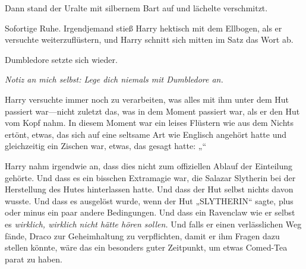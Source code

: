 Dann stand der Uralte mit silbernem Bart auf und lächelte verschmitzt.

Sofortige Ruhe. Irgendjemand stieß Harry hektisch mit dem Ellbogen, als er versuchte weiterzuflüstern, und Harry schnitt sich mitten im Satz das Wort ab.

Dumbledore setzte sich wieder.

\emph{Notiz an mich selbst: Lege dich niemals mit Dumbledore an.}

Harry versuchte immer noch zu verarbeiten, was alles mit ihm unter dem Hut passiert war—nicht zuletzt das, was in dem Moment passiert war, als er den Hut vom Kopf nahm. In diesem Moment war ein leises Flüstern wie aus dem Nichts ertönt, etwas, das sich auf eine seltsame Art wie Englisch angehört hatte und gleichzeitig ein Zischen war, etwas, das gesagt hatte: „“

Harry nahm irgendwie an, dass dies nicht zum offiziellen Ablauf der Einteilung gehörte. Und dass es ein bisschen Extramagie war, die Salazar Slytherin bei der Herstellung des Hutes hinterlassen hatte. Und dass der Hut selbst nichts davon wusste. Und dass es ausgelöst wurde, wenn der Hut „SLYTHERIN“ sagte, plus oder minus ein paar andere Bedingungen. Und dass ein Ravenclaw wie er selbst es \emph{wirklich, wirklich nicht hätte hören sollen.} Und falls er einen verlässlichen Weg fände, Draco zur Geheimhaltung zu verpflichten, damit er ihm Fragen dazu stellen könnte, wäre das ein besonders guter Zeitpunkt, um etwas Comed-Tea parat zu haben.

